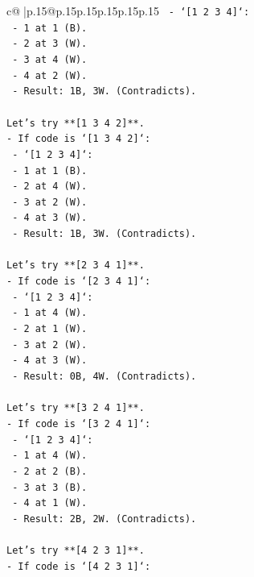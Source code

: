 \documentclass{article}
\begin{document}
{\begin{supertabular}{c@{$\;$}|p{.15\linewidth}@{}p{.15\linewidth}p{.15\linewidth}p{.15\linewidth}p{.15\linewidth}p{.15\linewidth}}
{{{\texttt{  {-} `{[}1 2 3 4{]}`:} \\
\texttt{    {-} 1 at 1 (B).} \\
\texttt{    {-} 2 at 3 (W).} \\
\texttt{    {-} 3 at 4 (W).} \\
\texttt{    {-} 4 at 2 (W).} \\
\texttt{    {-} Result: 1B, 3W. (Contradicts).} \\
\\ 
\texttt{Let's try **{[}1 3 4 2{]}**.} \\
\texttt{{-} If code is `{[}1 3 4 2{]}`:} \\
\texttt{  {-} `{[}1 2 3 4{]}`:} \\
\texttt{    {-} 1 at 1 (B).} \\
\texttt{    {-} 2 at 4 (W).} \\
\texttt{    {-} 3 at 2 (W).} \\
\texttt{    {-} 4 at 3 (W).} \\
\texttt{    {-} Result: 1B, 3W. (Contradicts).} \\
\\ 
\texttt{Let's try **{[}2 3 4 1{]}**.} \\
\texttt{{-} If code is `{[}2 3 4 1{]}`:} \\
\texttt{  {-} `{[}1 2 3 4{]}`:} \\
\texttt{    {-} 1 at 4 (W).} \\
\texttt{    {-} 2 at 1 (W).} \\
\texttt{    {-} 3 at 2 (W).} \\
\texttt{    {-} 4 at 3 (W).} \\
\texttt{    {-} Result: 0B, 4W. (Contradicts).} \\
\\ 
\texttt{Let's try **{[}3 2 4 1{]}**.} \\
\texttt{{-} If code is `{[}3 2 4 1{]}`:} \\
\texttt{  {-} `{[}1 2 3 4{]}`:} \\
\texttt{    {-} 1 at 4 (W).} \\
\texttt{    {-} 2 at 2 (B).} \\
\texttt{    {-} 3 at 3 (B).} \\
\texttt{    {-} 4 at 1 (W).} \\
\texttt{    {-} Result: 2B, 2W. (Contradicts).} \\
\\ 
\texttt{Let's try **{[}4 2 3 1{]}**.} \\
\texttt{{-} If code is `{[}4 2 3 1{]}`:} \\
}}}
\end{supertabular}}
\end{document}
